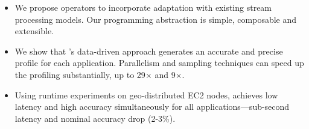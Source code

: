 \begin{itemize}[leftmargin=*, topsep=2pt, itemsep=2pt]

\item We propose \maybe{} operators to incorporate adaptation with existing
  stream processing models. Our programming abstraction is simple, composable
  and extensible.

\item We show that \sysname{}'s data-driven approach generates an accurate and
  precise profile for each application. Parallelism and sampling techniques
  can speed up the profiling substantially, up to 29$\times$ and 9$\times$\@.

\item Using runtime experiments on geo-distributed EC2 nodes, \sysname{}
  achieves low latency and high accuracy simultaneously for all
  applications---sub-second latency and nominal accuracy drop (2-3\%).

\end{itemize}


